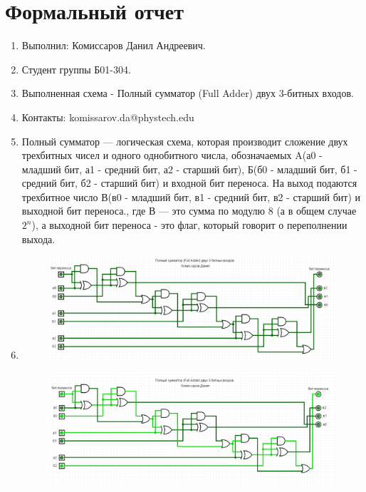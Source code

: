 



\section{Формальный отчет}
\begin{enumerate}
    \item Выполнил: Комиссаров Данил Андреевич.
    \item Студент группы Б01-304.
    \item Выполненная схема - Полный сумматор (Full Adder) двух 3-битных входов.
    \item Контакты: komissarov.da@phystech.edu
    \item Полный сумматор — логическая схема, которая производит сложение двух трехбитных чисел и одного однобитного числа, обозначаемых A(а0 - младший бит, а1 - средний бит, а2 - старший бит), Б(б0 - младший бит, б1 - средний бит, б2 - старший бит) и входной бит переноса. На выход подаются трехбитное число В(в0 - младший бит, в1 - средний бит, в2 - старший бит) и выходной бит переноса., где В — это сумма по модулю 8 (а в общем случае $2^n$), а выходной бит переноса - это флаг, который говорит о переполнении выхода.
    \item 
    \begin{figure}[H]
        \centering
        \includegraphics[width=1\linewidth]{Formal/Photo1.png}
    \end{figure}
    \begin{figure}[H]
        \centering
        \includegraphics[width=1\linewidth]{Formal/Photo2.png}

\end{figure}
\end{enumerate}
